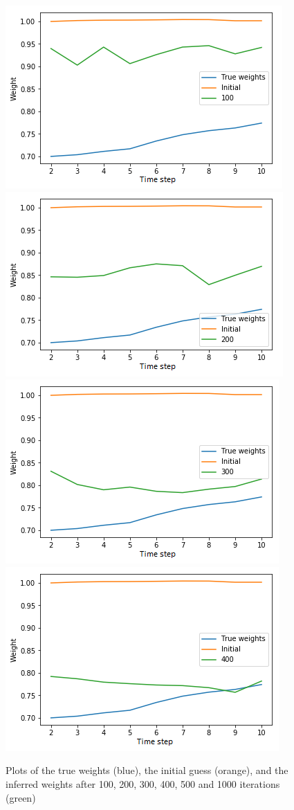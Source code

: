 \begin{figure}[P]
\caption{Plots of the true weights (blue), the initial guess (orange), and the inferred weights after 100, 200, 300, 400, 500 and 1000 iterations (green)}
\label{fig:trajectories}
    \centering
    \includegraphics[scale=0.5]{fig/10000_100_wa.png}
    \includegraphics[scale = 0.5]{fig/10000_200_wa.png}\\
    \includegraphics[scale = 0.5]{fig/10000_300_wa.png}
    \includegraphics[scale = 0.5]{fig/10000_400_wa.png}\\

\end{figure}
